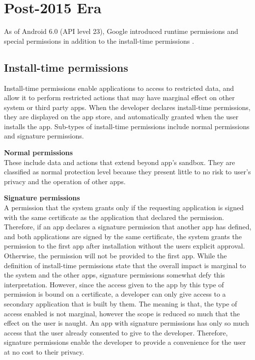 \documentclass[
  a4paper,  %
  twoside,  %
  bibliography=totoc,
  headsepline,
  cleardoublepage=empty,
  parskip=half,
  draft=false,
  open=any
]{scrbook}
\begin{document}
\section{Post-2015 Era}
As of Android 6.0 (API level 23), Google introduced runtime permissions and special permissions in addition to the install-time permissions \cite{devAndroid}. 

\subsection{Install-time permissions}
Install-time permissions enable applications to access to restricted data, and allow it to perform restricted actions that may have marginal effect on other system or third party apps. When the developer declares install-time permissions, they are displayed on the app store, and automatically granted when the user installs the app. Sub-types of install-time permissions include normal permissions and signature permissions.

\textbf{\sffamily Normal permissions}\\
These include data and actions that extend beyond app's sandbox. They are classified as normal protection level because they present little to no risk to user's privacy and the operation of other apps. 

\textbf{\sffamily Signature permissions}\\
A permission that the system grants only if the requesting application is signed with the same certificate as the application that declared the permission. Therefore, if an app declares a signature permission that another app has defined, and both applications are signed by the same certificate, the system grants the permission to the first app after installation without the users explicit approval. Otherwise, the permission will not be provided to the first app. While the definition of install-time permissions state that the overall impact is marginal to the system and the other apps, signature permissions somewhat defy this interpretation. However, since the access given to the app by this type of permission is bound on a certificate, a developer can only give access to a secondary application that is built by them. The meaning is that, the type of access enabled is not marginal, however the scope is reduced so much that the effect on the user is naught. An app with signature permissions has only so much access that the user already consented to give to the developer. Therefore, signature permissions enable the developer to provide a convenience for the user at no cost to their privacy.
\end{document}

